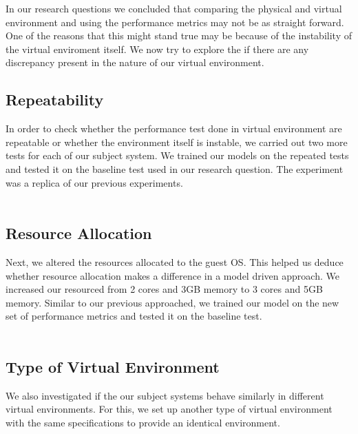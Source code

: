 In our research questions we concluded that comparing the physical and virtual environment and using the performance metrics may not be as straight forward. One of the reasons that this might stand true may be because of the instability of the virtual enviroment itself. We now try to explore the if there are any discrepancy present in the nature of our virtual environment.

\subsection{Repeatability}
In order to check whether the performance test done in virtual environment are repeatable or whether the environment itself is instable, we carried out two more tests for each of our subject system. We trained our models on the repeated tests and tested it on the baseline test used in our research question. The experiment was a replica of our previous experiments.
\\
\\




\subsection{Resource Allocation}
Next, we altered the resources allocated to the guest OS. This helped us deduce whether resource allocation makes a difference in a model driven approach. We increased our resourced from 2 cores and 3GB memory to 3 cores and 5GB memory. Similar to our previous approached, we trained our model on the new set of performance metrics and tested it on the baseline test.
\\
\\


\subsection{Type of Virtual Environment}

We also investigated if the our subject systems behave similarly in different virtual environments. For this, we set up another type of virtual environment with the same specifications to provide an identical environment. 

\fbox{\textit{}}